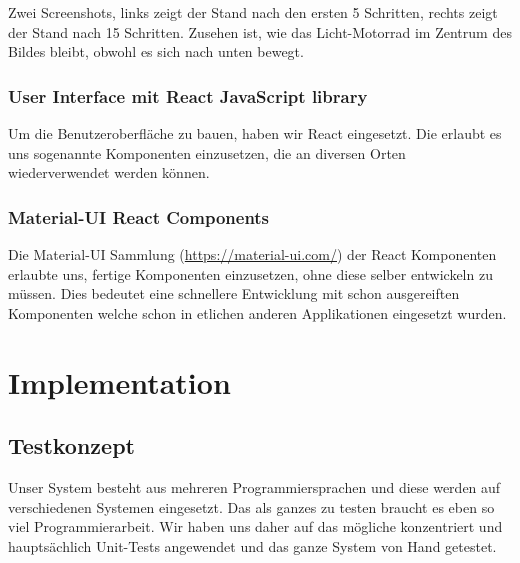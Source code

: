 \documentclass[11pt,ngerman]{article}
\begin{document}
	Zwei Screenshots, links zeigt der Stand nach den ersten 5 Schritten, rechts zeigt der Stand nach 15 Schritten. Zusehen ist, wie das Licht-Motorrad im Zentrum des Bildes bleibt, obwohl es sich nach unten bewegt.

    \subsubsection{User Interface mit React JavaScript library}
    Um die Benutzeroberfläche zu bauen, haben wir \Gls{React} eingesetzt. Die erlaubt es uns sogenannte Komponenten einzusetzen, die an diversen Orten wiederverwendet werden können.

    \subsubsection{Material-UI React Components}
    Die Material-UI Sammlung (\url{https://material-ui.com/}) der \Gls{React} Komponenten erlaubte uns, fertige Komponenten einzusetzen, ohne diese selber entwickeln zu müssen. Dies bedeutet eine schnellere Entwicklung mit schon ausgereiften Komponenten welche schon in etlichen anderen Applikationen eingesetzt wurden.


    \section{Implementation}

    \subsection{Testkonzept}
    Unser System besteht aus mehreren Programmiersprachen und diese werden auf verschiedenen Systemen eingesetzt. Das als ganzes zu testen braucht es eben so viel Programmierarbeit. Wir haben uns daher auf das mögliche konzentriert und hauptsächlich Unit-Tests angewendet und das ganze System von Hand getestet.
\end{document}
